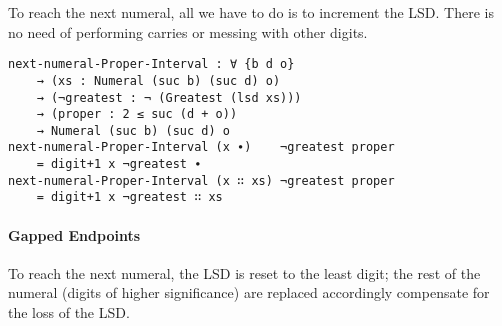 \documentclass[\main/thesis.tex]{subfiles}
\begin{document}
To reach the next numeral, all we have to do is to increment the LSD.
There is no need of performing carries or messing with other digits.

\begin{lstlisting}[basicstyle=\ttfamily\scriptsize]
next-numeral-Proper-Interval : ∀ {b d o}
    → (xs : Numeral (suc b) (suc d) o)
    → (¬greatest : ¬ (Greatest (lsd xs)))
    → (proper : 2 ≤ suc (d + o))
    → Numeral (suc b) (suc d) o
next-numeral-Proper-Interval (x ∙)    ¬greatest proper
    = digit+1 x ¬greatest ∙
next-numeral-Proper-Interval (x ∷ xs) ¬greatest proper
    = digit+1 x ¬greatest ∷ xs
\end{lstlisting}

\paragraph{Gapped Endpoints}

\begin{center}
    \begin{adjustbox}{max width=\textwidth}
    \end{adjustbox}
\end{center}

To reach the next numeral, the LSD is reset to the least digit;
the rest of the numeral (digits of higher significance) are replaced accordingly
compensate for the loss of the LSD.
\end{document}
